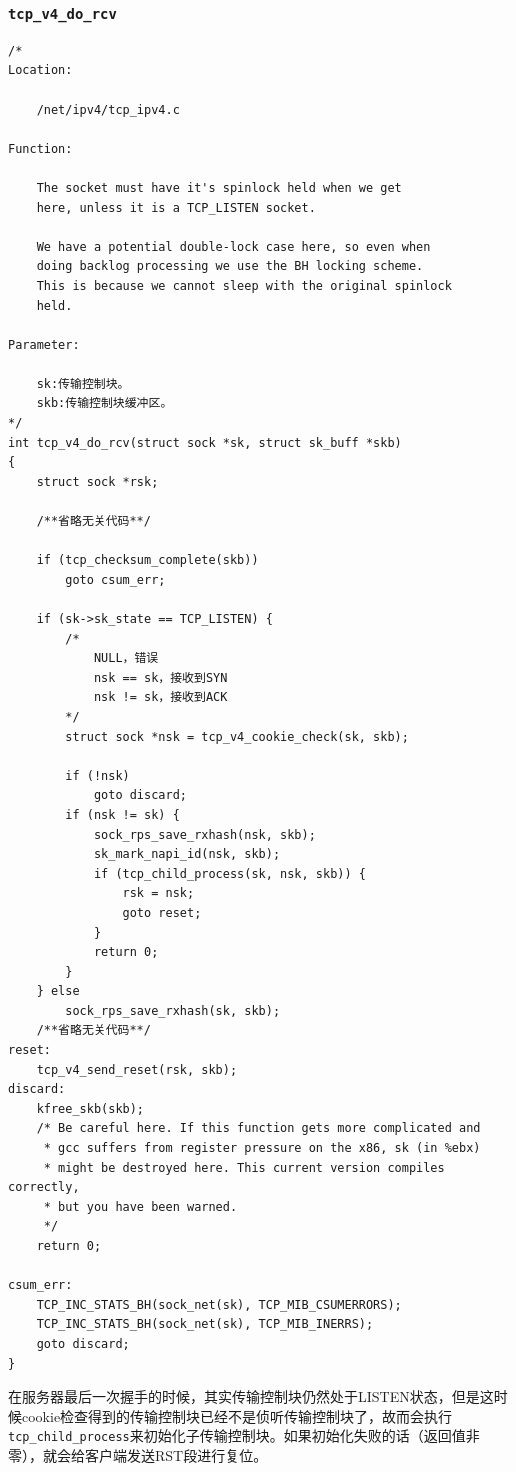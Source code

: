             \subsubsection{\texttt{tcp_v4_do_rcv}}
                \label{ServerReceiveACK:tcp_v4_do_rcv}
\begin{verbatim}
/* 
Location:

    /net/ipv4/tcp_ipv4.c

Function:

    The socket must have it's spinlock held when we get
    here, unless it is a TCP_LISTEN socket.

    We have a potential double-lock case here, so even when
    doing backlog processing we use the BH locking scheme.
    This is because we cannot sleep with the original spinlock
    held.

Parameter:

    sk:传输控制块。
    skb:传输控制块缓冲区。
*/
int tcp_v4_do_rcv(struct sock *sk, struct sk_buff *skb)
{
    struct sock *rsk;

    /**省略无关代码**/

    if (tcp_checksum_complete(skb))
        goto csum_err;

    if (sk->sk_state == TCP_LISTEN) {
        /*
            NULL，错误 
            nsk == sk，接收到SYN 
            nsk != sk，接收到ACK 
        */
        struct sock *nsk = tcp_v4_cookie_check(sk, skb);

        if (!nsk)
            goto discard;
        if (nsk != sk) {
            sock_rps_save_rxhash(nsk, skb);
            sk_mark_napi_id(nsk, skb);
            if (tcp_child_process(sk, nsk, skb)) {
                rsk = nsk;
                goto reset;
            }
            return 0;
        }
    } else
        sock_rps_save_rxhash(sk, skb);
    /**省略无关代码**/
reset:
    tcp_v4_send_reset(rsk, skb);
discard:
    kfree_skb(skb);
    /* Be careful here. If this function gets more complicated and
     * gcc suffers from register pressure on the x86, sk (in %ebx)
     * might be destroyed here. This current version compiles correctly,
     * but you have been warned.
     */
    return 0;

csum_err:
    TCP_INC_STATS_BH(sock_net(sk), TCP_MIB_CSUMERRORS);
    TCP_INC_STATS_BH(sock_net(sk), TCP_MIB_INERRS);
    goto discard;
}
\end{verbatim}
                    在服务器最后一次握手的时候，其实传输控制块仍然处于LISTEN状态，但是这时候cookie检查得到的传输控制块已经不是侦听传输控制块了，故而会执行\texttt{tcp_child_process}来初始化子传输控制块。如果初始化失败的话（返回值非零），就会给客户端发送RST段进行复位。


